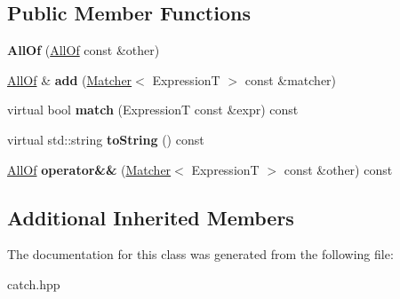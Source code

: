 \subsection*{Public Member Functions}
\begin{DoxyCompactItemize}
\item 
{\bfseries All\+Of} (\hyperlink{classCatch_1_1Matchers_1_1Impl_1_1Generic_1_1AllOf}{All\+Of} const \&other)\hypertarget{classCatch_1_1Matchers_1_1Impl_1_1Generic_1_1AllOf_a31f7c5e570e79bdf64064ee87c331a59}{}\label{classCatch_1_1Matchers_1_1Impl_1_1Generic_1_1AllOf_a31f7c5e570e79bdf64064ee87c331a59}

\item 
\hyperlink{classCatch_1_1Matchers_1_1Impl_1_1Generic_1_1AllOf}{All\+Of} \& {\bfseries add} (\hyperlink{structCatch_1_1Matchers_1_1Impl_1_1Matcher}{Matcher}$<$ ExpressionT $>$ const \&matcher)\hypertarget{classCatch_1_1Matchers_1_1Impl_1_1Generic_1_1AllOf_a8c5cd1e494ab697076da418ee72ac297}{}\label{classCatch_1_1Matchers_1_1Impl_1_1Generic_1_1AllOf_a8c5cd1e494ab697076da418ee72ac297}

\item 
virtual bool {\bfseries match} (ExpressionT const \&expr) const \hypertarget{classCatch_1_1Matchers_1_1Impl_1_1Generic_1_1AllOf_a04534d0ac9e089f4500c3c19054f11ce}{}\label{classCatch_1_1Matchers_1_1Impl_1_1Generic_1_1AllOf_a04534d0ac9e089f4500c3c19054f11ce}

\item 
virtual std\+::string {\bfseries to\+String} () const \hypertarget{classCatch_1_1Matchers_1_1Impl_1_1Generic_1_1AllOf_a9febc1e67acbeff62a32bcbfdc0c8fab}{}\label{classCatch_1_1Matchers_1_1Impl_1_1Generic_1_1AllOf_a9febc1e67acbeff62a32bcbfdc0c8fab}

\item 
\hyperlink{classCatch_1_1Matchers_1_1Impl_1_1Generic_1_1AllOf}{All\+Of} {\bfseries operator\&\&} (\hyperlink{structCatch_1_1Matchers_1_1Impl_1_1Matcher}{Matcher}$<$ ExpressionT $>$ const \&other) const \hypertarget{classCatch_1_1Matchers_1_1Impl_1_1Generic_1_1AllOf_ac2b4045ae39746852a0f603715ba1387}{}\label{classCatch_1_1Matchers_1_1Impl_1_1Generic_1_1AllOf_ac2b4045ae39746852a0f603715ba1387}

\end{DoxyCompactItemize}
\subsection*{Additional Inherited Members}


The documentation for this class was generated from the following file\+:\begin{DoxyCompactItemize}
\item 
catch.\+hpp\end{DoxyCompactItemize}
